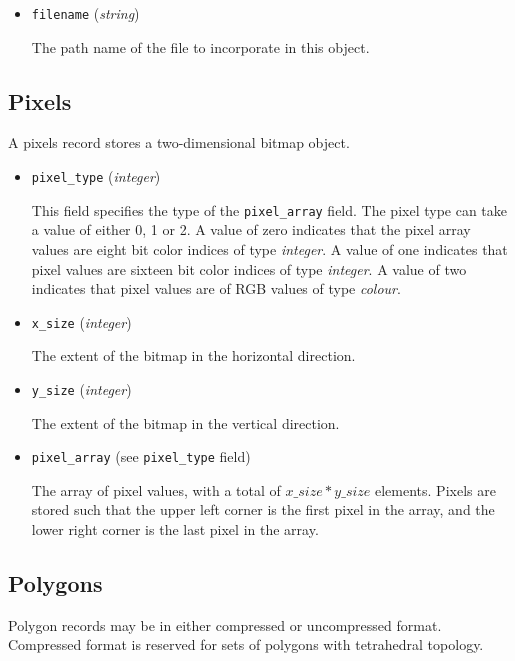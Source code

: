 \documentclass{article}
\newcommand{\kw}[1]{{\tt \mbox{#1}}}
\begin{document}
\begin{itemize}

\item \kw{filename} ({\it string})

The path name of the file to incorporate in this object.

\end{itemize}

\subsection{Pixels}
A pixels record stores a two-dimensional bitmap object.

\begin{itemize}

\item \kw{pixel\_type} ({\it integer})

This field specifies the type of the \kw{pixel\_array} field.  The
pixel type can take a value of either 0, 1 or 2.  A value of zero
indicates that the pixel array values are eight bit color indices of
type {\it integer}.  A value of one indicates that pixel values are
sixteen bit color indices of type {\it integer}.  A value of two
indicates that pixel values are of RGB values of type {\it colour}.

\item \kw{x\_size} ({\it integer})

The extent of the bitmap in the horizontal direction.

\item \kw{y\_size} ({\it integer})

The extent of the bitmap in the vertical direction.

\item \kw{pixel\_array} (see \kw{pixel\_type} field)

The array of pixel values, with a total of $x\_size * y\_size$ elements.
Pixels are stored such that the upper left corner is the first pixel in
the array, and the lower right corner is the last pixel in the array.

\end{itemize}

\subsection{Polygons}

Polygon records may be in either compressed or uncompressed
format. Compressed format is reserved for sets of polygons with
tetrahedral topology.
\end{document}
